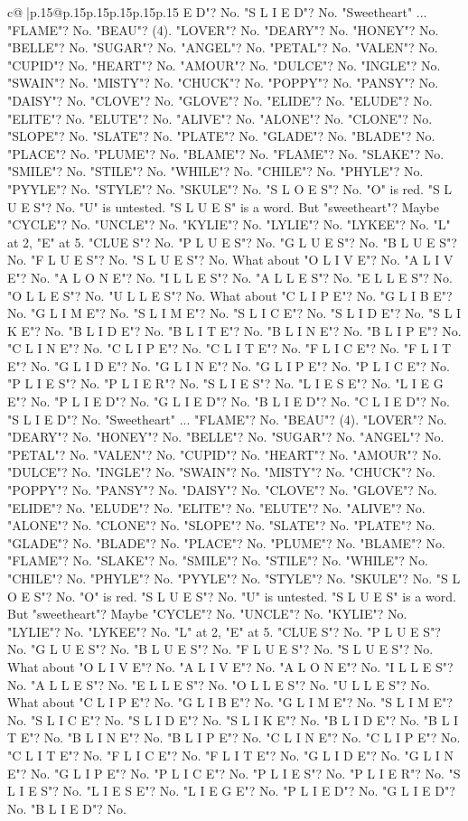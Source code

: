 \documentclass{article}
\begin{document}
{\begin{supertabular}{c@{$\;$}|p{.15\linewidth}@{}p{.15\linewidth}p{.15\linewidth}p{.15\linewidth}p{.15\linewidth}p{.15\linewidth}}
{{{E D"? No. "S L I E D"? No. "Sweetheart" ... "FLAME"? No. "BEAU"? (4). "LOVER"? No. "DEARY"? No. "HONEY"? No. "BELLE"? No. "SUGAR"? No. "ANGEL"? No. "PETAL"? No. "VALEN"? No. "CUPID"? No. "HEART"? No. "AMOUR"? No. "DULCE"? No. "INGLE"? No. "SWAIN"? No. "MISTY"? No. "CHUCK"? No. "POPPY"? No. "PANSY"? No. "DAISY"? No. "CLOVE"? No. "GLOVE"? No. "ELIDE"? No. "ELUDE"? No. "ELITE"? No. "ELUTE"? No. "ALIVE"? No. "ALONE"? No. "CLONE"? No. "SLOPE"? No. "SLATE"? No. "PLATE"? No. "GLADE"? No. "BLADE"? No. "PLACE"? No. "PLUME"? No. "BLAME"? No. "FLAME"? No. "SLAKE"? No. "SMILE"? No. "STILE"? No. "WHILE"? No. "CHILE"? No. "PHYLE"? No. "PYYLE"? No. "STYLE"? No. "SKULE"? No. "S L O E S"? No. "O" is red. "S L U E S"? No. "U" is untested. "S L U E S" is a word. But "sweetheart"? Maybe "CYCLE"? No. "UNCLE"? No. "KYLIE"? No. "LYLIE"? No. "LYKEE"? No. "L" at 2, "E" at 5. "CLUE S"? No. "P L U E S"? No. "G L U E S"? No. "B L U E S"? No. "F L U E S"? No. "S L U E S"? No. What about "O L I V E"? No. "A L I V E"? No. "A L O N E"? No. "I L L E S"? No. "A L L E S"? No. "E L L E S"? No. "O L L E S"? No. "U L L E S"? No. What about "C L I P E"? No. "G L I B E"? No. "G L I M E"? No. "S L I M E"? No. "S L I C E"? No. "S L I D E"? No. "S L I K E"? No. "B L I D E"? No. "B L I T E"? No. "B L I N E"? No. "B L I P E"? No. "C L I N E"? No. "C L I P E"? No. "C L I T E"? No. "F L I C E"? No. "F L I T E"? No. "G L I D E"? No. "G L I N E"? No. "G L I P E"? No. "P L I C E"? No. "P L I E S"? No. "P L I E R"? No. "S L I E S"? No. "L I E S E"? No. "L I E G E"? No. "P L I E D"? No. "G L I E D"? No. "B L I E D"? No. "C L I E D"? No. "S L I E D"? No. "Sweetheart" ... "FLAME"? No. "BEAU"? (4). "LOVER"? No. "DEARY"? No. "HONEY"? No. "BELLE"? No. "SUGAR"? No. "ANGEL"? No. "PETAL"? No. "VALEN"? No. "CUPID"? No. "HEART"? No. "AMOUR"? No. "DULCE"? No. "INGLE"? No. "SWAIN"? No. "MISTY"? No. "CHUCK"? No. "POPPY"? No. "PANSY"? No. "DAISY"? No. "CLOVE"? No. "GLOVE"? No. "ELIDE"? No. "ELUDE"? No. "ELITE"? No. "ELUTE"? No. "ALIVE"? No. "ALONE"? No. "CLONE"? No. "SLOPE"? No. "SLATE"? No. "PLATE"? No. "GLADE"? No. "BLADE"? No. "PLACE"? No. "PLUME"? No. "BLAME"? No. "FLAME"? No. "SLAKE"? No. "SMILE"? No. "STILE"? No. "WHILE"? No. "CHILE"? No. "PHYLE"? No. "PYYLE"? No. "STYLE"? No. "SKULE"? No. "S L O E S"? No. "O" is red. "S L U E S"? No. "U" is untested. "S L U E S" is a word. But "sweetheart"? Maybe "CYCLE"? No. "UNCLE"? No. "KYLIE"? No. "LYLIE"? No. "LYKEE"? No. "L" at 2, "E" at 5. "CLUE S"? No. "P L U E S"? No. "G L U E S"? No. "B L U E S"? No. "F L U E S"? No. "S L U E S"? No. What about "O L I V E"? No. "A L I V E"? No. "A L O N E"? No. "I L L E S"? No. "A L L E S"? No. "E L L E S"? No. "O L L E S"? No. "U L L E S"? No. What about "C L I P E"? No. "G L I B E"? No. "G L I M E"? No. "S L I M E"? No. "S L I C E"? No. "S L I D E"? No. "S L I K E"? No. "B L I D E"? No. "B L I T E"? No. "B L I N E"? No. "B L I P E"? No. "C L I N E"? No. "C L I P E"? No. "C L I T E"? No. "F L I C E"? No. "F L I T E"? No. "G L I D E"? No. "G L I N E"? No. "G L I P E"? No. "P L I C E"? No. "P L I E S"? No. "P L I E R"? No. "S L I E S"? No. "L I E S E"? No. "L I E G E"? No. "P L I E D"? No. "G L I E D"? No. "B L I E D"? No. }}}
\end{supertabular}}
\end{document}
